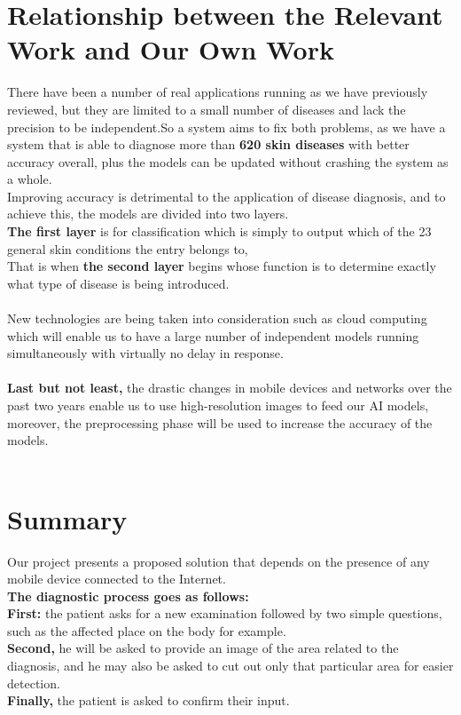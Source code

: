 \section{Relationship between the Relevant Work and Our Own Work }
There have been a number of real applications running as we have previously reviewed, but they are limited to a small number of diseases and lack the precision to be independent.So a system aims to fix both problems, as we have a system that is able to diagnose more than \textbf{620 skin diseases} with better accuracy overall, plus the models can be updated without crashing the system as a whole.\\
Improving accuracy is detrimental to the application of disease diagnosis, and to achieve this, the models are divided into two layers.\\

\textbf{The first layer} is for classification which is simply to output which of the 23 general skin conditions the entry belongs to,\\
That is when \textbf{the second layer}  begins whose function is to determine exactly what type of disease is being introduced.\\\\
New technologies are being taken into consideration such as cloud computing which will enable us to have a large number of independent models running simultaneously with virtually no delay in response.\\\\
\textbf{Last but not least,} the drastic changes in mobile devices and networks over the past two years enable us to use high-resolution images to feed our AI models, moreover, the preprocessing phase will be used to increase the accuracy of the models.\\\\

\section{Summary }
Our project presents a proposed solution that depends on the presence of any mobile device connected to the Internet.\\
\textbf{The diagnostic process goes as follows:}\\
\textbf{First:} the patient asks for a new examination followed by two simple questions, such as the affected place on the body for example.\\
\textbf{Second,} he will be asked to provide an image of the area related to the diagnosis, and he may also be asked to cut out only that particular area for easier detection.\\
\textbf{Finally,} the patient is asked to confirm their input.\\


